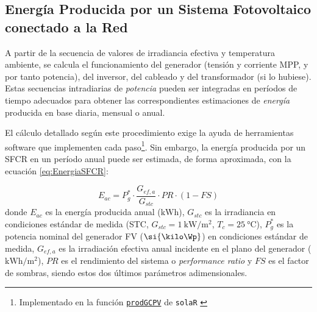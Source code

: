 


\subsection{Energía Producida por un Sistema Fotovoltaico conectado a
  la Red}

A partir de la secuencia de valores de irradiancia efectiva y
temperatura ambiente, se calcula el funcionamiento del generador
(tensión y corriente MPP, y por tanto potencia), del inversor, del
cableado y del transformador (si lo hubiese). Estas secuencias
intradiarias de \emph{potencia} pueden ser integradas en períodos de
tiempo adecuados para obtener las correspondientes estimaciones de
\emph{energía} producida en base diaria, mensual o anual.

El cálculo detallado según este procedimiento exige la ayuda de
herramientas software que implementen cada paso\footnote{Implementado en la
  función \href{http://search.r-project.org/R/library/solaR/html/prodGCPV.html}{\texttt{prodGCPV}} de \texttt{solaR} \cite{Perpinan2012b}}. Sin embargo, la
energía producida por un SFCR en un período anual puede ser estimada,
de forma aproximada, con la ecuación \ref{eq:EnergiaSFCR}:

\begin{equation}
  E_{ac}=P_{g}^{*}\cdot\frac{G_{ef,a}}{G_{stc}} \cdot PR \cdot (1-FS)
  \label{eq:EnergiaSFCR}
\end{equation}
donde $E_{ac}$ es la energía producida anual ($\si{\kWh}$), $G_{stc}$
es la irradiancia en condiciones estándar de medida (STC,
$G_{stc}=\SI{1}{\kW\per\meter\squared}$,
$T_c=\SI{25}{\celsius}$), $P_{g}^{*}$ es la potencia nominal del
generador FV ($\si{\kilo\Wp}$) en condiciones estándar de
medida, $G_{ef,a}$ es la irradiación efectiva anual incidente en el
plano del generador ($\si{\kWh\per\meter\squared}$), $PR$ es el
rendimiento del sistema o \emph{performance ratio }y $FS$ es el factor
de sombras, siendo estos dos últimos parámetros adimensionales.

